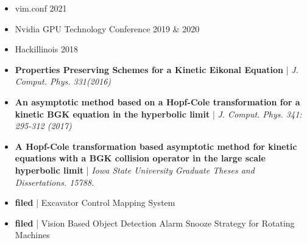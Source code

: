 \documentclass[10pt,a4paper,ragged2e,withhyper]{altacv}
\begin{document}
\begin{paracol}{2}

\begin{itemize}
\item vim.conf 2021
\item Nvidia GPU Technology Conference 2019 \& 2020
\item Hackillinois 2018

\end{itemize}



\begin{itemize}
\item {\faFile*[regular]} \textbf{Properties Preserving Schemes for a Kinetic Eikonal Equation} | \textit{J. Comput. Phys. 331(2016)}
\item {\faFile*[regular]} \textbf{An asymptotic method based on a Hopf-Cole transformation for a kinetic BGK equation in the hyperbolic limit} | \textit{J. Comput. Phys. 341: 295-312 (2017)}
\item {\faFile*[regular]} \textbf{A Hopf-Cole transformation based asymptotic method for kinetic equations with a BGK collision operator in the large scale hyperbolic limit} | \textit{Iowa State University Graduate Theses and Dissertations. 15788.}

\end{itemize}


\begin{itemize}
\item \textbf{filed} | Excavator Control Mapping System
\item \textbf{filed} | Vision Based Object Detection Alarm Snooze Strategy for Rotating Machines

\end{itemize}



{}

{}
{}


\end{paracol}
\end{document}
